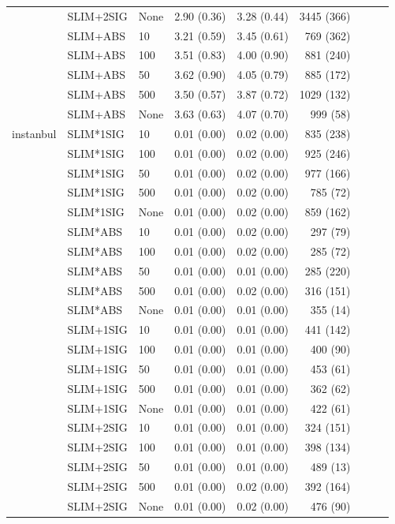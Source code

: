 \begin{longtable}{lllrrrrrr}
 & SLIM+2SIG & None & 2.90 (0.36) & 3.28 (0.44) & 3445 (366) \\
 & SLIM+ABS & 10 & 3.21 (0.59) & 3.45 (0.61) & 769 (362) \\
 & SLIM+ABS & 100 & 3.51 (0.83) & 4.00 (0.90) & 881 (240) \\
 & SLIM+ABS & 50 & 3.62 (0.90) & 4.05 (0.79) & 885 (172) \\
 & SLIM+ABS & 500 & 3.50 (0.57) & 3.87 (0.72) & 1029 (132) \\
 & SLIM+ABS & None & 3.63 (0.63) & 4.07 (0.70) & 999 (58) \\
\midrule
instanbul & SLIM*1SIG & 10 & 0.01 (0.00) & 0.02 (0.00) & 835 (238) \\
 & SLIM*1SIG & 100 & 0.01 (0.00) & 0.02 (0.00) & 925 (246) \\
 & SLIM*1SIG & 50 & 0.01 (0.00) & 0.02 (0.00) & 977 (166) \\
 & SLIM*1SIG & 500 & 0.01 (0.00) & 0.02 (0.00) & 785 (72) \\
 & SLIM*1SIG & None & 0.01 (0.00) & 0.02 (0.00) & 859 (162) \\
 & SLIM*ABS & 10 & 0.01 (0.00) & 0.02 (0.00) & 297 (79) \\
 & SLIM*ABS & 100 & 0.01 (0.00) & 0.02 (0.00) & 285 (72) \\
 & SLIM*ABS & 50 & 0.01 (0.00) & 0.01 (0.00) & 285 (220) \\
 & SLIM*ABS & 500 & 0.01 (0.00) & 0.02 (0.00) & 316 (151) \\
 & SLIM*ABS & None & 0.01 (0.00) & 0.01 (0.00) & 355 (14) \\
 & SLIM+1SIG & 10 & 0.01 (0.00) & 0.01 (0.00) & 441 (142) \\
 & SLIM+1SIG & 100 & 0.01 (0.00) & 0.01 (0.00) & 400 (90) \\
 & SLIM+1SIG & 50 & 0.01 (0.00) & 0.01 (0.00) & 453 (61) \\
 & SLIM+1SIG & 500 & 0.01 (0.00) & 0.01 (0.00) & 362 (62) \\
 & SLIM+1SIG & None & 0.01 (0.00) & 0.01 (0.00) & 422 (61) \\
 & SLIM+2SIG & 10 & 0.01 (0.00) & 0.01 (0.00) & 324 (151) \\
 & SLIM+2SIG & 100 & 0.01 (0.00) & 0.01 (0.00) & 398 (134) \\
 & SLIM+2SIG & 50 & 0.01 (0.00) & 0.01 (0.00) & 489 (13) \\
 & SLIM+2SIG & 500 & 0.01 (0.00) & 0.02 (0.00) & 392 (164) \\
 & SLIM+2SIG & None & 0.01 (0.00) & 0.02 (0.00) & 476 (90) \\

\end{longtable}
